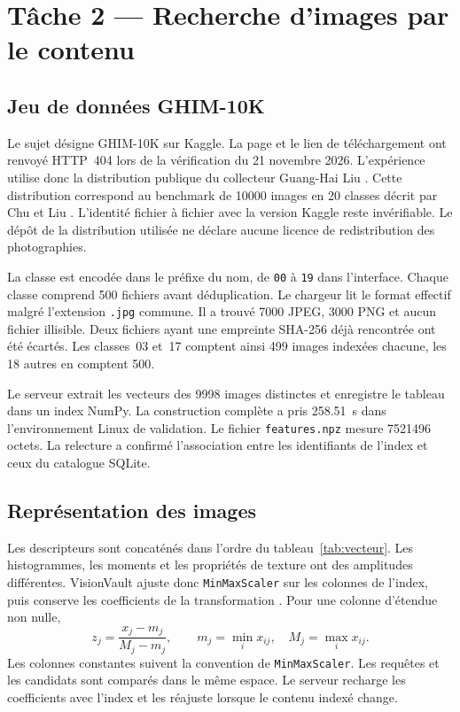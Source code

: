 \clearpage
\section{Tâche 2 — Recherche d'images par le contenu}

\subsection{Jeu de données GHIM-10K}
\label{sec:corpus}
Le sujet désigne GHIM-10K sur Kaggle. La page et le lien de téléchargement ont renvoyé HTTP~404 lors de la vérification du 21 novembre 2026. L'expérience utilise donc la distribution publique du collecteur Guang-Hai Liu \cite{ghim}. Cette distribution correspond au benchmark de \num{10000} images en 20 classes décrit par Chu et Liu \cite[section~4.1]{chu2020}. L'identité fichier à fichier avec la version Kaggle reste invérifiable. Le dépôt de la distribution utilisée ne déclare aucune licence de redistribution des photographies.

La classe est encodée dans le préfixe du nom, de \texttt{00} à \texttt{19} dans l'interface. Chaque classe comprend 500 fichiers avant déduplication. Le chargeur lit le format effectif malgré l'extension \texttt{.jpg} commune. Il a trouvé \num{7000} JPEG, \num{3000} PNG et aucun fichier illisible. Deux fichiers ayant une empreinte SHA-256 déjà rencontrée ont été écartés. Les classes~03 et~17 comptent ainsi 499 images indexées chacune, les 18 autres en comptent 500.

Le serveur extrait les vecteurs des \num{9998} images distinctes et enregistre le tableau dans un index NumPy. La construction complète a pris \qty{258.51}{\second} dans l'environnement Linux de validation. Le fichier \texttt{features.npz} mesure \num{7521496} octets. La relecture a confirmé l'association entre les identifiants de l'index et ceux du catalogue SQLite.

\subsection{Représentation des images}
Les descripteurs sont concaténés dans l'ordre du tableau~\ref{tab:vecteur}. Les histogrammes, les moments et les propriétés de texture ont des amplitudes différentes. VisionVault ajuste donc \texttt{MinMaxScaler} sur les colonnes de l'index, puis conserve les coefficients de la transformation \cite{sklearn}. Pour une colonne d'étendue non nulle,
\begin{equation}
  z_j=\frac{x_j-m_j}{M_j-m_j},
  \qquad m_j=\min_i x_{ij},\quad M_j=\max_i x_{ij}.
  \label{eq:minmax}
\end{equation}
Les colonnes constantes suivent la convention de \texttt{MinMaxScaler}. Les requêtes et les candidats sont comparés dans le même espace. Le serveur recharge les coefficients avec l'index et les réajuste lorsque le contenu indexé change.

